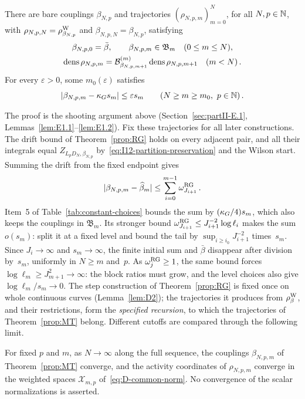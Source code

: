 \begin{theorem}\label{prop:MT}
There are bare couplings $\beta_{N,p}$ and trajectories $(\rho_{N,p,m})_{m=0}^N$, for all $N,p\in\mathbb{N}$, with $\rho_{N,p,N}=\rho^{\rm W}_{\beta_{N,p}}$ and $\beta_{N,p,N}=\beta_{N,p}$, satisfying
\begin{gather*}
\beta_{N,p,0}=\bar\beta,\qquad \beta_{N,p,m}\in\mathfrak B_m\quad(0\le m\le N),\\
\operatorname{dens}\rho_{N,p,m}=\mathcal{B}^{(m)}_{\beta_{N,p,m+1}}\operatorname{dens}\rho_{N,p,m+1}\quad(m<N)\,.
\end{gather*}
For every $\varepsilon>0$, some $m_0(\varepsilon)$ satisfies
\begin{equation*}
|\beta_{N,p,m}-\kappa_G s_m|\le\varepsilon s_m
\qquad(N\ge m\ge m_0,\ p\in\mathbb{N})\,.
\end{equation*}
\end{theorem}

The proof is the shooting argument above (Section~\ref{sec:partII-E.1}, Lemmas~\ref{lem:E1.1}--\ref{lem:E1.2}). Fix these trajectories for all later constructions. The drift bound of Theorem~\ref{prop:RG} holds on every adjacent pair, and all their integrals equal $Z_{L_pD_N,\beta_{N,p}}$ by~\eqref{eq:I12-partition-preservation} and the Wilson start. Summing the drift from the fixed endpoint gives
\begin{equation}\label{eq:I12-drift-sum}
|\beta_{N,p,m}-\widehat{\beta}_m|\le\sum_{i=0}^{m-1}\omega_{J_{i+1}}^{\rm RG}\,.
\end{equation}
Item~5 of Table~\ref{tab:constant-choices} bounds the sum by $(\kappa_G/4)s_m$, which also keeps the couplings in $\mathfrak B_m$. Its stronger bound $\omega_{J_{i+1}}^{\rm RG}\le J_{i+1}^{-2}\log\ell_i$ makes the sum $o(s_m)$: split it at a fixed level and bound the tail by $\sup_{i\ge i_0}J_{i+1}^{-2}$ times~$s_m$. Since $J_i\to\infty$ and $s_m\to\infty$, the finite initial sum and $\bar\beta$ disappear after division by~$s_m$, uniformly in $N\ge m$ and~$p$. As $\omega_j^{\rm RG}\ge1$, the same bound forces $\log\ell_m\ge J_{m+1}^2\to\infty$: the block ratios must grow, and the level choices also give $\log\ell_m/s_m\to0$. The step construction of Theorem~\ref{prop:RG} is fixed once on whole continuous curves (Lemma~\ref{lem:D2}); the trajectories it produces from $\rho^{\rm W}_\beta$, and their restrictions, form the \emph{specified recursion}, to which the trajectories of Theorem~\ref{prop:MT} belong. Different cutoffs are compared through the following limit.

\begin{proposition}\label{prop:fixed-level}
For fixed $p$ and $m$, as $N\to\infty$ along the full sequence, the couplings $\beta_{N,p,m}$ of
Theorem~\ref{prop:MT} converge, and the activity coordinates of $\rho_{N,p,m}$ converge in the
weighted spaces $\mathcal X_{m,p}$ of~\eqref{eq:D-common-norm}. No convergence of the scalar normalizations is asserted.
\end{proposition}


